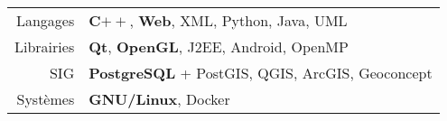 
\begin{tabu} to 
  Langages & \textbf{C$++$}, \textbf{Web}, XML, Python, Java, UML\\
  Librairies & \textbf{Qt}, \textbf{OpenGL}, J2EE, Android, OpenMP\\
  SIG & \textbf{PostgreSQL} + PostGIS, QGIS, ArcGIS, Geoconcept\\
  Systèmes & \textbf{GNU/Linux}, Docker
\end{tabu}

